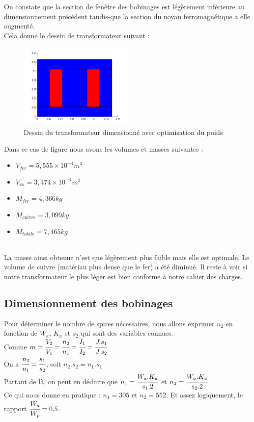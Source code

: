 On constate que la section de fenêtre des bobinages est légèrement inférieure au dimensionnement précédent tandis-que la section du noyau ferromagnétique a elle augmenté.\\

\newpage
Cela donne le dessin de transformateur suivant :\\
\begin{figure}[h]
	\begin{center}
	\includegraphics[width=0.5\textwidth]{images/TP1_transfo_poids}
	\caption{Dessin du transformateur dimensionné avec optimisation du poids}\label{img:dessinTransfoPoids}
	\end{center}
\end{figure}
\FloatBarrier 

Dans ce cas de figure nous avons les volumes et masses suivantes : \\
\begin{itemize}
\item $V_{fer} = 5,555 \times{}10^{-4} m^3$
\item $V_{cu} = 3,474 \times{}10^{-4} m^3$
\item $M_{fer} = 4,366 kg$
\item $M_{cuivre} = 3,099 kg $
\item $M_{totale} = 7,465 kg $
\end{itemize}~\\

La masse ainsi obtenue n'est que légèrement plus faible mais elle est optimale. Le volume de cuivre (matériau plus dense que le fer) a été diminué. Il reste à voir si notre transformateur le plus léger est bien conforme à notre cahier des charges.\\

\subsection{Dimensionnement des bobinages}
Pour déterminer le nombre de spires nécessaires, nous allons exprimer $n_2$ en fonction de $W_a$, $K_u$ et $s_2$ qui sont des variables connues.\\
Comme $ m = \cfrac{V_2}{V_1} = \cfrac{n_2}{n_1} = \cfrac{I_1}{I_2} = \cfrac{J.s_1}{J.s_2}$ \\
On a $ \cfrac{n_2}{n_1} = \cfrac{s_1}{s_2} $, soit $ n_2.s_2 = n_1.s_1 $\\
Partant de là, on peut en déduire que $n_1 = \cfrac{W_a.K_u}{s_1.2}$ et $n_2 = \cfrac{W_a.K_u}{s_2.2}$\\
Ce qui nous donne en pratique : $n_1 = 305$ et $n_2 = 552$. Et assez logiquement, le rapport $\cfrac{W_a}{W_p}=0.5$.\\

